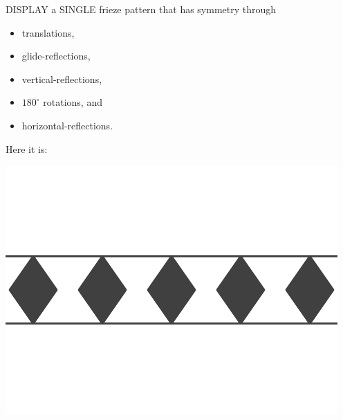 \documentclass[noauthor,nooutcomes,12pt,hints,handout]{ximera}
\begin{document}
\begin{question}
  DISPLAY a SINGLE frieze pattern that has symmetry through
  \begin{itemize}
  \item translations,
  \item glide-reflections,
  \item vertical-reflections,
  \item $180^\circ$ rotations, and
  \item horizontal-reflections.
  \end{itemize}
  \begin{freeResponse}
    Here it is:
    \begin{center}
      \includegraphics[width=.6\textwidth]{ansTGV8H.png}
    \end{center}
  \end{freeResponse}
\end{question}
\end{document}
